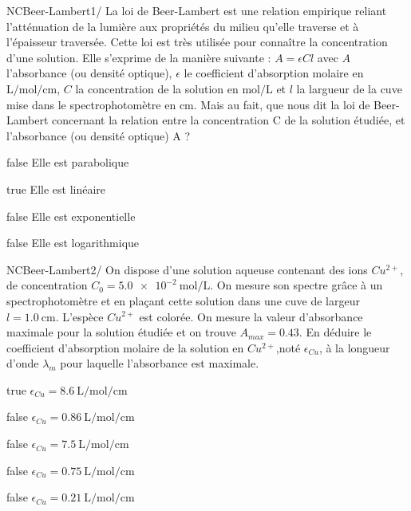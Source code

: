             \begin{question}{NC}{Beer-Lambert}{1}{/} 
				La loi de Beer-Lambert est une relation empirique reliant l'atténuation de la lumière aux propriétés du milieu qu'elle traverse et à l'épaisseur traversée. Cette loi est très utilisée pour connaître la concentration d'une solution. Elle s'exprime de la manière suivante : $A=\epsilon C l$ avec $A$ l'absorbance (ou densité optique), $\epsilon$ le coefficient d'absorption molaire en $\si{\liter\per\mole\per\centi\meter}$, $C$ la concentration de la solution en $\si{\mole\per\liter}$ et $l$ la largueur de la cuve mise dans le spectrophotomètre en $\si{\centi\meter}$. Mais au fait, que nous dit la loi de Beer-Lambert concernant la relation entre la concentration C de la solution étudiée, et l'absorbance (ou densité optique) A ? 
            \end{question}
            \begin{reponses}
            	\item[false]  Elle est parabolique
            	\item[true]   Elle est linéaire
                \item[false]  Elle est exponentielle
                \item[false]  Elle est logarithmique
            \end{reponses}
            \begin{question}{NC}{Beer-Lambert}{2}{/} 
				On dispose d'une solution aqueuse contenant des ions $Cu^{2+}$, de concentration $C_0= \SI{ 5,0e-2}{\mol\per\liter}$. On mesure son spectre grâce à un spectrophotomètre et en plaçant cette solution dans une cuve de largeur $l= \SI{1,0}{\si\centi\meter}$. L'espèce $Cu^{2+}$ est colorée. On mesure la valeur d'absorbance maximale pour la solution étudiée et on trouve $A_{max} = 0.43$. En déduire le coefficient d’absorption molaire de la solution en $Cu^{2+}$,noté $\epsilon_{Cu}$, à la longueur d’onde $\lambda_m$ pour laquelle l’absorbance est maximale.
            \end{question}
%
           \begin{reponses}
            	\item[true] $\epsilon_{Cu} =  \SI{8.6}{\liter\per\mole\per\centi\meter}$
            	\item[false] $\epsilon_{Cu} = \SI{0.86}{\liter\per\mole\per\centi\meter}$
                \item[false] $\epsilon_{Cu} = \SI{7.5}{\liter\per\mole\per\centi\meter}$
                \item[false] $\epsilon_{Cu} = \SI{0.75}{\liter\per\mole\per\centi\meter}$
                \item[false] $\epsilon_{Cu} = \SI{0.21}{\liter\per\mole\per\centi\meter}$
            \end{reponses}

